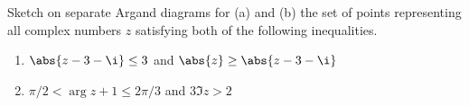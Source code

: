 \begin{solution}
\begin{ppart}
\begin{center}
        \end{center}
    \end{ppart}
\end{solution}

\clearpage
\begin{problem}
    Sketch on separate Argand diagrams for (a) and (b) the set of points representing all complex numbers $z$ satisfying both of the following inequalities.

    \begin{enumerate}
        \item $\abs{z - 3 - \i} \leq 3$ and $\abs{z} \geq \abs{z - 3 - \i}$
        \item $\pi/2 < \arg{z + 1} \leq 2\pi/3$ and $3 \Im{z} > 2$
    \end{enumerate}
\end{problem}
